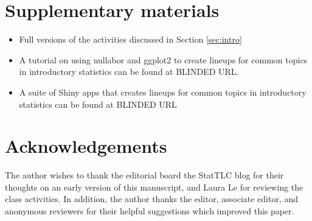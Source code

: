 \documentclass[12pt]{article}
\begin{document}
\section*{Supplementary materials}

\begin{itemize}
\item
  Full versions of the activities discussed in Section \ref{sec:intro}
\item
  A tutorial on using nullabor and ggplot2 to create lineups for common
  topics in introductory statistics can be found at BLINDED URL.
\item
  A suite of Shiny apps that creates lineups for common topics in
  introductory statistics can be found at BLINDED URL
\end{itemize}

\section*{Acknowledgements}

The author wishes to thank the editorial board the StatTLC blog for
their thoughts on an early version of this manuscript, and Laura Le for
reviewing the class activities. In addition, the author thanks the
editor, associate editor, and anonymous reviewers for their helpful
suggestions which improved this paper.



\end{document}
